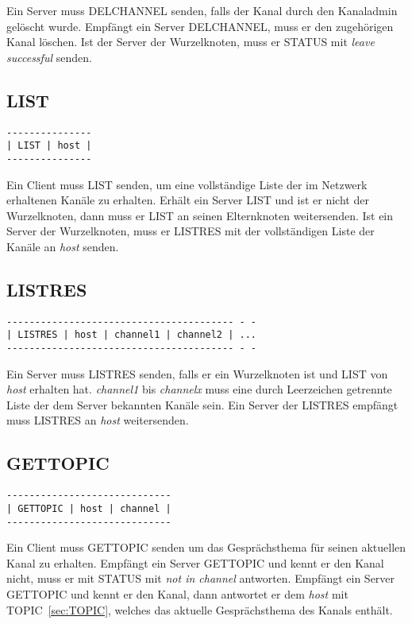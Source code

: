 \documentclass{article}
\begin{document}
Ein Server muss DELCHANNEL senden, falls der Kanal durch den Kanaladmin gelöscht wurde.
Empfängt ein Server DELCHANNEL, muss er den zugehörigen Kanal löschen.
Ist der Server der Wurzelknoten, muss er STATUS mit \emph{leave successful} senden.

\subsection{LIST}

\begin{lstlisting}
---------------
| LIST | host |
---------------
\end{lstlisting}

Ein Client muss LIST senden, um eine vollständige Liste der im Netzwerk erhaltenen Kanäle zu erhalten.
Erhält ein Server LIST und ist er nicht der Wurzelknoten, dann muss er LIST an seinen Elternknoten weitersenden.
Ist ein Server der Wurzelknoten, muss er LISTRES mit der vollständigen Liste der Kanäle an \emph{host} senden.

\subsection{LISTRES}

\begin{lstlisting}
---------------------------------------- - -
| LISTRES | host | channel1 | channel2 | ...
---------------------------------------- - -
\end{lstlisting}

Ein Server muss LISTRES senden, falls er ein Wurzelknoten ist und LIST von \emph{host} erhalten hat.
\emph{channel1} bis \emph{channelx} muss eine durch Leerzeichen getrennte Liste der dem Server bekannten Kanäle sein.
Ein Server der LISTRES empfängt muss LISTRES an \emph{host} weitersenden.

\subsection{GETTOPIC}

\begin{lstlisting}
-----------------------------
| GETTOPIC | host | channel |
-----------------------------
\end{lstlisting}

Ein Client muss GETTOPIC senden um das Gesprächsthema für seinen aktuellen Kanal zu erhalten.
Empfängt ein Server GETTOPIC und kennt er den Kanal nicht, muss er mit STATUS mit \emph{not in channel} antworten.
Empfängt ein Server GETTOPIC und kennt er den Kanal, dann antwortet er dem \emph{host} mit TOPIC~\ref{sec:TOPIC}, welches das aktuelle Gesprächsthema des Kanals enthält.
\end{document}
